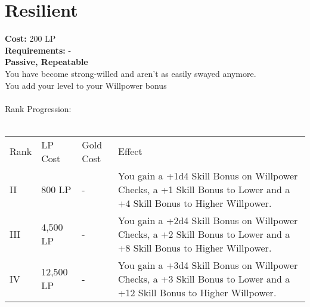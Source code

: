 \section{Resilient}\label{perk:resilient}
\textbf{Cost:} 200 LP\\
\textbf{Requirements:} -\\
\textbf{Passive, Repeatable}\\
You have become strong-willed and aren't as easily swayed anymore.\\
You add your level to your Willpower bonus\\
\\
Rank Progression:\\
\\
\begin{longtable}{l | l | l | p{9cm}}
	Rank & LP Cost & Gold Cost & Effect\\
	II & 800 LP & - & You gain a +1d4 Skill Bonus on Willpower Checks, a +1 Skill Bonus to Lower and a +4 Skill Bonus to Higher Willpower.\\
	III & 4,500 LP & - & You gain a +2d4 Skill Bonus on Willpower Checks, a +2 Skill Bonus to Lower and a +8 Skill Bonus to Higher Willpower.\\
	IV & 12,500 LP & - & You gain a +3d4 Skill Bonus on Willpower Checks, a +3 Skill Bonus to Lower and a +12 Skill Bonus to Higher Willpower.\\
\end{longtable}
